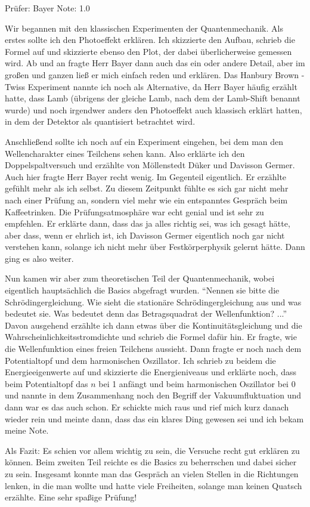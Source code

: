 Prüfer: Bayer Note: 1.0

Wir begannen mit den klassischen Experimenten der Quantenmechanik. Als erstes sollte ich den Photoeffekt erklären. 
Ich skizzierte den Aufbau, schrieb die Formel auf und skizzierte ebenso den Plot, der dabei überlicherweise gemessen wird.
Ab und an fragte Herr Bayer dann auch das ein oder andere Detail, aber im großen und ganzen ließ er mich einfach reden und erklären. 
Das Hanbury Brown - Twiss Experiment nannte ich noch als Alternative, da Herr Bayer häufig erzählt hatte, dass Lamb (übrigens der gleiche Lamb, nach dem der Lamb-Shift benannt wurde) und noch irgendwer anders den Photoeffekt auch klassisch erklärt hatten, in dem der Detektor als quantisiert betrachtet wird. 

Anschließend sollte ich noch auf ein Experiment eingehen, bei dem man den Wellencharakter eines Teilchens sehen kann. Also erklärte ich den Doppelspaltversuch und erzählte von Möllenstedt Düker und Davisson Germer. Auch hier fragte Herr Bayer recht wenig. Im Gegenteil eigentlich. Er erzählte gefühlt mehr als ich selbst. Zu diesem Zeitpunkt fühlte es sich gar nicht mehr nach einer Prüfung an, sondern viel mehr wie ein entspanntes Gespräch beim Kaffeetrinken. Die Prüfungsatmosphäre war echt genial und ist sehr zu empfehlen. Er erklärte dann, dass das ja alles richtig sei, was ich gesagt hätte, aber dass, wenn er ehrlich ist, ich Davisson Germer eigentlich noch gar nicht verstehen kann, solange ich nicht mehr über Festkörperphysik gelernt hätte. Dann ging es also weiter. 

Nun kamen wir aber zum theoretischen Teil der Quantenmechanik, wobei eigentlich hauptsächlich die Basics abgefragt wurden. \enquote{Nennen sie bitte die Schrödingergleichung. Wie sieht die stationäre Schrödingergleichung aus und was bedeutet sie. Was bedeutet denn das Betragsquadrat der Wellenfunktion? ...} Davon ausgehend erzählte ich dann etwas über die Kontinuitätsgleichung und die Wahrscheinlichkeitsstromdichte und schrieb die Formel dafür hin. Er fragte, wie die Wellenfunktion eines freien Teilchens aussieht. Dann fragte er noch nach dem Potentialtopf und dem harmonischen Oszillator. Ich schrieb zu beidem die Energieeigenwerte auf und skizzierte die Energieniveaus und erklärte noch, dass beim Potentialtopf das $n$ bei \num{1} anfängt und beim harmonischen Oszillator bei \num{0} und nannte in dem Zusammenhang noch den Begriff der Vakuumfluktuation und dann war es das auch schon. Er schickte mich raus und rief mich kurz danach wieder rein und meinte dann, dass das ein klares Ding gewesen sei und ich bekam meine Note.

Als Fazit: Es schien vor allem wichtig zu sein, die Versuche recht gut erklären zu können. Beim zweiten Teil reichte es die Basics zu beherrschen und dabei sicher zu sein. Insgesamt konnte man das Gespräch an vielen Stellen in die Richtungen lenken, in die man wollte und hatte viele Freiheiten, solange man keinen Quatsch erzählte. Eine sehr spaßige Prüfung! 
